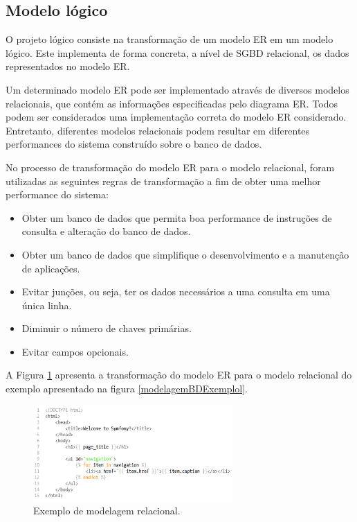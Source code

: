 \subsection{Modelo lógico}
\label{fundBDProjeto}

O projeto lógico consiste na transformação de um modelo ER em um modelo lógico. Este implementa de forma concreta, a nível de SGBD relacional, os dados representados no modelo ER.

Um determinado modelo ER pode ser implementado através de diversos modelos relacionais, que contém as informações especificadas pelo diagrama ER. Todos podem ser considerados uma implementação correta do modelo ER considerado. Entretanto, diferentes modelos relacionais podem resultar em diferentes performances do sistema construído sobre o banco de dados. 

No processo de transformação do modelo ER para o modelo relacional, foram utilizadas as seguintes regras de transformação \cite{heuser} a fim de obter uma melhor performance do sistema: 

\begin{itemize}
    \item Obter um banco de dados que permita boa performance de instruções de consulta e alteração do banco de dados.
    
    \item Obter um banco de dados que simplifique o desenvolvimento e a manutenção de aplicações.
    
    \item Evitar junções, ou seja, ter os dados necessários a uma consulta em uma única linha.
    
    \item Diminuir o número de chaves primárias.
    
    \item Evitar campos opcionais.
    
\end{itemize}

A Figura \ref{modelagemBDLogicoExemplol} apresenta a transformação do modelo ER para o modelo relacional do exemplo apresentado na figura \ref{modelagemBDExemplol}.

\begin{figure}[h]
    \caption{Exemplo de modelagem relacional.}
       	\begin{center}
            \includegraphics[width=0.68\textwidth]{figuras/twig-symf.png}
        \end{center}
    \label{modelagemBDLogicoExemplol}
\end{figure}


